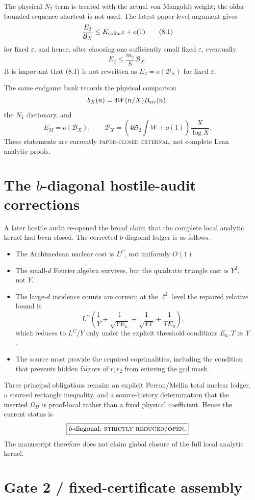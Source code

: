 \documentclass[11pt]{article}
\theoremstyle{definition}
\newcommand{\1}{\mathbf 1}
\newcommand{\BX}{\mathcal B_X}
\newcommand{\paperclosed}{\textsc{paper-closed external}}
\newcommand{\openstatus}{\textsc{open}}
\newcommand{\reduced}{\textsc{strictly reduced}}
\begin{document}
The physical $N_2$ term is treated with the actual von Mangoldt weight; the older bounded-sequence shortcut is not used. The latest paper-level argument gives
\[
\frac{E_2}{\BX}\le K_{\rm collar}\varepsilon+o(1)
\tag{8.1}
\]
for fixed $\varepsilon$, and hence, after choosing one sufficiently small fixed $\varepsilon$, eventually
\[
E_2\le \frac{m_\varepsilon}{8}\BX.
\tag{8.2}
\]
It is important that (8.1) is not rewritten as $E_2=o(\BX)$ for fixed $\varepsilon$.

The same endgame bank records the physical comparison
\[
b_X(n)=4W(n/X)B_{\rm src}(n),
\]
the $N_1$ dictionary, and
\[
E_M=o(\BX),\qquad
\BX=(4\mathfrak S_2\int W+o(1))\frac{X}{\log X}.
\tag{8.3}
\]
These statements are currently \paperclosed, not complete Lean analytic proofs.

\section{The $b$-diagonal hostile-audit corrections}

A later hostile audit re-opened the broad claim that the complete local analytic kernel had been closed. The corrected $b$-diagonal ledger is as follows.
\begin{itemize}[leftmargin=*]
\item The Archimedean nuclear cost is $L^C$, not uniformly $O(1)$.
\item The small-$d$ Fourier algebra survives, but the quadratic triangle cost is $Y^2$, not $Y$.
\item The large-$d$ incidence counts are correct; at the $\ell^2$ level the repaired relative bound is
\[
L^C\left(\frac1Y+\frac1{\sqrt{YE_a}}+\frac1{\sqrt{YT}}+\frac1{TE_a}\right),
\]
which reduces to $L^C/Y$ only under the explicit threshold conditions $E_a,T\gg Y$.
\item The source must provide the required coprimalities, including the condition that prevents hidden factors of $r_1r_2$ from entering the gcd mask.
\end{itemize}
Three principal obligations remain: an explicit Perron/Mellin total nuclear ledger, a sourced rectangle inequality, and a source-history determination that the inserted $\Omega_H$ is proof-local rather than a fixed physical coefficient. Hence the current status is
\[
\boxed{\text{$b$-diagonal: \reduced/\openstatus}.}
\]
The manuscript therefore does not claim global closure of the full local analytic kernel.

\section{Gate 2 / fixed-certificate assembly}
\end{document}
